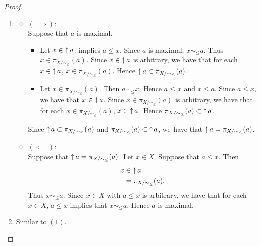 \documentclass{book}
\begin{document}
	\begin{proof}\
		\begin{enumerate}
			\item 
			\begin{itemize}
				\item $(\implies)$: \\
				Suppose that $a$ is maximal. 
				\begin{itemize}
					\item Let $x \in \operatorname{\uparrow} a$.  implies $a \leq x$. Since $a$ is maximal, $x \sim_{\leq} a$. Thus $x \in \pi_{X/\sim_{\leq}}(a)$. Since $x \in \operatorname{\uparrow} a$ is arbitrary, we have that for each $x \in \operatorname{\uparrow} a$, $x \in \pi_{X/\sim_{\leq}}(a)$. Hence $\operatorname{\uparrow} a \subset \pi_{X/\sim_{\leq}}(a)$.
					\item Let $x \in \pi_{X/\sim_{\leq}}(a)$. Then $a \sim_{\leq} x$. Hence $a \leq x$ and $x \leq a$. Since $a \leq x$, we have that $x \in \operatorname{\uparrow} a$. Since $x \in \pi_{X/\sim_{\leq}}(a)$ is arbitrary, we have that for each $x \in \pi_{X/\sim_{\leq}}(a)$, $x \in \operatorname{\uparrow} a$. Hence $\pi_{X/\sim_{\leq}}(a) \subset \operatorname{\uparrow} a$.
				\end{itemize}
				Since $\operatorname{\uparrow} a \subset \pi_{X/\sim_{\leq}}(a)$ and $\pi_{X/\sim_{\leq}}(a) \subset \operatorname{\uparrow} a$, we have that $\operatorname{\uparrow} a = \pi_{X/\sim_{\leq}}(a)$.
				\item $(\impliedby)$: \\
				Suppose that $\operatorname{\uparrow} a = \pi_{X/\sim_{\leq}}(a)$. Let $x \in X$. Suppose that $a \leq x$. Then 
				\begin{align*}
					x 
					& \in \operatorname{\uparrow} a \\
					& = \pi_{X/\sim_{\leq}}(a).
				\end{align*}
				Thus $x \sim_{\leq} a$. Since $x \in X$ with $a \leq x$ is arbitrary, we have that for each $x \in X$, $a \leq x$ implies that $x \sim_{\leq} a$. Hence $a$ is maximal.
			\end{itemize}
			\item Similar to $(1)$.
		\end{enumerate}
	\end{proof}
	
	
	
	
	
	
	
	
	
	
	
	
	
	
	
	
	
	
	
\end{document}
